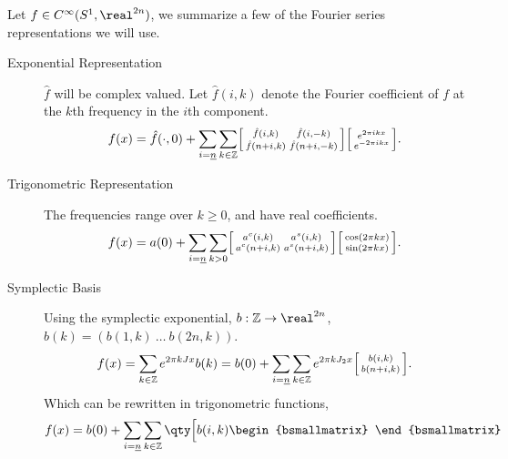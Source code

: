 \documentclass[../main-v2-manifolds.tex]{subfiles}
\begin{document}
Let $f\in C^\infty(S^1,\realtn)$, we summarize a few of the Fourier series representations we will use. 
\begin{description}
\item[Exponential Representation]
    $\hat{f}$ will be complex valued. Let $\hat{f}(i,k)$ denote the Fourier coefficient of $f$ at the $k$th frequency in the $i$th component.
    \begin{equation}
        f(x) = \hat{f}(\cdot,0)+\sum_{i=\underline{n}}\sum_{k\in\mathbb{Z}} \begin{bsmallmatrix}
            \hat{f}(i,k) & \hat{f}(i,-k) \\
            \hat{f}(n+i,k) & \hat{f}(n+i,-k)
        \end{bsmallmatrix}\begin{bsmallmatrix}
            e^{2\pi i k x}\\ 
            e^{-2\pi i k x}
        \end{bsmallmatrix}.
    \end{equation}
\item[Trigonometric Representation]
    The frequencies range over $k\geq 0$, and have real coefficients.
    \begin{equation}
        f(x) = a(0) + \sum_{i=\underline{n}}\sum_{k>0}\begin{bsmallmatrix}
            a^c(i,k) & a^s(i,k) \\
            a^c(n+i,k) & a^s(n+i,k) 
        \end{bsmallmatrix}\begin{bsmallmatrix}
            \cos(2\pi k x) \\
            \sin(2\pi k x)
        \end{bsmallmatrix}.
    \end{equation}
\item[Symplectic Basis]
    Using the symplectic exponential, $b:\mathbb{Z}\to\realtn$, $b(k) = (b(1,k)\: \ldots \: b(2n,k))$.
    \begin{equation}
        f(x) = \sum_{k\in\mathbb{Z}}e^{2\pi k J x}b(k) = b(0) + \sum_{i=\underline{n}}\sum_{k\in\mathbb{Z}} e^{2\pi k J_2 x}\begin{bsmallmatrix}
            b(i,k) \\
            b(n+i,k)
        \end{bsmallmatrix}.
    \end{equation}
    Which can be rewritten in trigonometric functions,
    \begin{equation}
        f(x) = b(0) + \sum_{i=\underline{n}}\sum_{k\in\mathbb{Z}} \qty\Big[b(i,k)\begin{bsmallmatrix}

\end{bsmallmatrix}
\end{equation}
\end{description}
\end{document}
